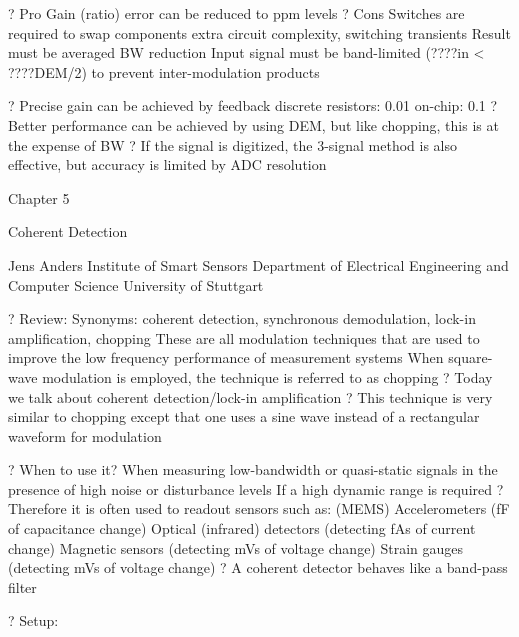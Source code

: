 \documentclass[2pt,landscape]{article}
\begin{document}
\begin{multicols*}{5}
?	Pro
\textbullet 	Gain (ratio) error can be reduced to ppm levels
?	Cons
\textbullet 	Switches are required to swap components
extra circuit complexity, switching transients
\textbullet 	Result must be averaged	BW reduction
\textbullet 	Input signal must be band-limited (????in  < ????DEM/2) 
to prevent inter-modulation products



?	Precise gain can be achieved by feedback
\textbullet 	discrete resistors: 0.01%
\textbullet 	on-chip: 0.1%
?	Better performance can be achieved by using DEM, 
but like chopping, this is at the expense of BW
?	If the signal is digitized, the 3-signal method is also effective, but 
accuracy is limited by ADC resolution








Chapter 5

Coherent Detection

Jens Anders 
Institute of Smart Sensors
Department of Electrical Engineering and Computer 
Science
University of Stuttgart



?	Review:
\textbullet 	Synonyms: coherent detection, synchronous demodulation, lock-in 
amplification, chopping
\textbullet 	These are all modulation techniques that are used to improve the low 
frequency performance of measurement systems
\textbullet 	When square-wave modulation is employed, the technique is referred to as 
chopping
?	Today we talk about coherent detection/lock-in amplification
?	This technique is very similar to chopping except that one uses a
sine wave instead of a rectangular waveform for modulation



?	When to use it?
\textbullet 	When measuring low-bandwidth or quasi-static signals in the presence 
of high noise or disturbance levels
\textbullet 	If a high dynamic range is required
?	Therefore it is often used to readout sensors such as:
\textbullet 	(MEMS) Accelerometers (fF of capacitance change)
\textbullet 	Optical (infrared) detectors (detecting fA\textbullet s of current change)
\textbullet 	Magnetic sensors (detecting mV\textbullet s of voltage change)
\textbullet 	Strain gauges (detecting mV\textbullet s of voltage change)
?	A coherent detector behaves like a band-pass filter



?	Setup:













\end{multicols*}
\end{document}
